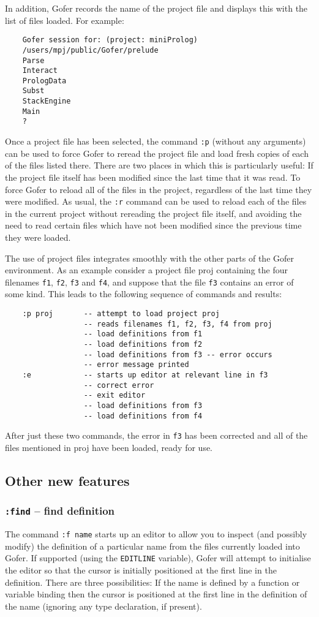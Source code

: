 In addition, Gofer records the name of the project file and displays
this with the list of files loaded.  For example:
\begin{verbatim}
    Gofer session for: (project: miniProlog)
    /users/mpj/public/Gofer/prelude 
    Parse
    Interact
    PrologData
    Subst
    StackEngine
    Main
    ? 
\end{verbatim}
Once a project file has been selected, the command \verb":p" (without any
arguments) can be used to force Gofer to reread the project file and
load fresh copies of each of the files listed there.  There are two
places in which this is particularly useful:
\BI
\IT If the project file itself has been modified since the last time
     that it was read.
\IT  To force Gofer to reload all of the files in the project,
     regardless of the last time they were modified.
\EI
As usual, the \verb":r" command can be used to reload each of the files in the
current project without rereading the project file itself, and avoiding
the need to read certain files which have not been modified since the
previous time they were loaded.

The use of project files integrates smoothly with the other parts of
the Gofer environment.  As an example consider a project file proj
containing the four filenames \verb"f1", \verb"f2", \verb"f3" 
and \verb"f4", and suppose that the
file \verb"f3" contains an error of some kind.  This leads to the following
sequence of commands and results:
\begin{verbatim}
    :p proj       -- attempt to load project proj
                  -- reads filenames f1, f2, f3, f4 from proj
                  -- load definitions from f1
                  -- load definitions from f2
                  -- load definitions from f3 -- error occurs
                  -- error message printed
    :e            -- starts up editor at relevant line in f3
                  -- correct error
                  -- exit editor
                  -- load definitions from f3
                  -- load definitions from f4
\end{verbatim}
After just these two commands, the error in \verb"f3" has been corrected and
all of the files mentioned in proj have been loaded, ready for use.


\subsection{Other new features}

\subsubsection{{\tt :find} -- find definition}
The command \verb":f name" starts up an editor to allow you to inspect (and
possibly modify) the definition of a particular name from the files
currently loaded into Gofer.  If supported (using the \verb"EDITLINE"
variable), Gofer will attempt to initialise the editor so that the
cursor is initially positioned at the first line in the definition.
There are three possibilities:
\BI
\IT  If the name is defined by a function or variable binding then
     the cursor is positioned at the first line in the definition of
     the name (ignoring any type declaration, if present).

